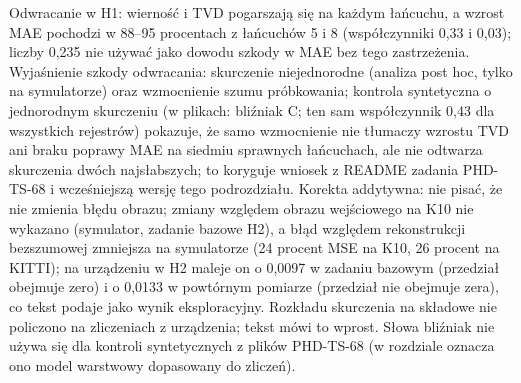 {Odwracanie w H1: wierność i TVD pogarszają się na każdym łańcuchu, a wzrost MAE pochodzi w 88--95 procentach z łańcuchów 5 i 8 (współczynniki 0,33 i 0,03); liczby 0,235 nie używać jako dowodu szkody w MAE bez tego zastrzeżenia.
Wyjaśnienie szkody odwracania: skurczenie niejednorodne (analiza post hoc, tylko na symulatorze) oraz wzmocnienie szumu próbkowania; kontrola syntetyczna o jednorodnym skurczeniu (w plikach: bliźniak C; ten sam współczynnik 0,43 dla wszystkich rejestrów) pokazuje, że samo wzmocnienie nie tłumaczy wzrostu TVD ani braku poprawy MAE na siedmiu sprawnych łańcuchach, ale nie odtwarza skurczenia dwóch najsłabszych; to koryguje wniosek z README zadania PHD-TS-68 i wcześniejszą wersję tego podrozdziału.
Korekta addytywna: nie pisać, że nie zmienia błędu obrazu; zmiany względem obrazu wejściowego na K10 nie wykazano (symulator, zadanie bazowe H2), a błąd względem rekonstrukcji bezszumowej zmniejsza na symulatorze (24 procent MSE na K10, 26 procent na KITTI); na urządzeniu w H2 maleje on o 0,0097 w zadaniu bazowym (przedział obejmuje zero) i o 0,0133 w powtórnym pomiarze (przedział nie obejmuje zera), co tekst podaje jako wynik eksploracyjny.
Rozkładu skurczenia na składowe nie policzono na zliczeniach z urządzenia; tekst mówi to wprost.
Słowa bliźniak nie używa się dla kontroli syntetycznych z plików PHD-TS-68 (w rozdziale oznacza ono model warstwowy dopasowany do zliczeń).
}
